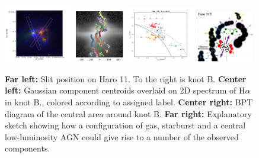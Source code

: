 \documentclass[10pt, letterpaper, headings=Large, DIV=14]{scrartcl}
\begin{document}
\begin{figure}[h] %
   \centering
   \includegraphics[width=0.27\textwidth]{Haro11-slit.pdf}
   \includegraphics[width=0.19\textwidth]{Selection_204.png} 
   \includegraphics[width=0.27\textwidth]{BPT-HaroB-Center.png} 
   \includegraphics[width=0.23\textwidth]{Selection_205.png} 
   \caption{\small \textbf{Far left:} Slit position on Haro 11. To the right is
   knot B. \textbf{Center left:} Gaussian component centroids overlaid on 2D
   spectrum of H$\alpha$ in knot B., colored according to assigned label.
   \textbf{Center right:} BPT diagram of the central area around knot B.
   \textbf{Far right:} Explanatory sketch showing how a configuration of gas,
   starburst and a central low-luminosity AGN could give rise to a number of
   the observed components.}
   \label{fig:haro}
\end{figure}
\end{document}
